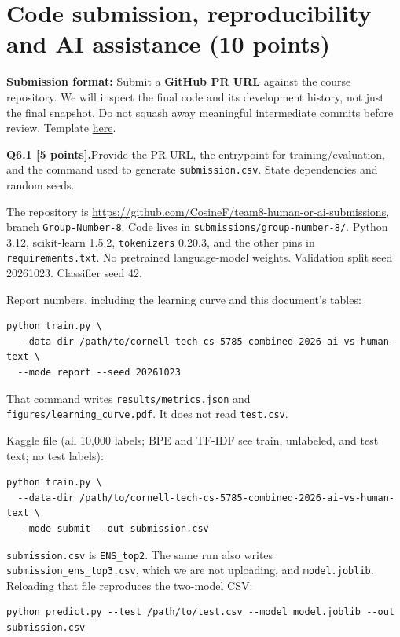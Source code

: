 \documentclass[11pt,letterpaper]{article}
\newcommand{\question}[2]{\needspace{4\baselineskip}\par\addvspace{0.45em}\noindent\textbf{#1}\quad #2\par\nobreak\vspace{0.1em}}
\begin{document}
\section{Code submission, reproducibility and AI assistance (10 points)}
\textbf{Submission format:} Submit a \textbf{GitHub PR URL} against the course repository. We will inspect the final code and its development history, not just the final snapshot. Do not squash away meaningful intermediate commits before review. Template \href{https://github.com/sekhari/human-or-ai-submissions}{here}.

\question{Q6.1 [5 points].}{Provide the PR URL, the entrypoint for training/evaluation, and the command used to generate \texttt{submission.csv}. State dependencies and random seeds.}

The repository is \url{https://github.com/CosineF/team8-human-or-ai-submissions}, branch \texttt{Group-Number-8}. Code lives in \texttt{submissions/group-number-8/}. Python 3.12, scikit-learn 1.5.2, \texttt{tokenizers} 0.20.3, and the other pins in \texttt{requirements.txt}. No pretrained language-model weights. Validation split seed 20261023. Classifier seed 42.

Report numbers, including the learning curve and this document's tables:

\begin{verbatim}
python train.py \
  --data-dir /path/to/cornell-tech-cs-5785-combined-2026-ai-vs-human-text \
  --mode report --seed 20261023
\end{verbatim}

That command writes \texttt{results/metrics.json} and \texttt{figures/learning\_curve.pdf}. It does not read \texttt{test.csv}.

Kaggle file (all 10{,}000 labels; BPE and TF-IDF see train, unlabeled, and test text; no test labels):

\begin{verbatim}
python train.py \
  --data-dir /path/to/cornell-tech-cs-5785-combined-2026-ai-vs-human-text \
  --mode submit --out submission.csv
\end{verbatim}

\texttt{submission.csv} is \texttt{ENS\_top2}. The same run also writes \texttt{submission\_ens\_top3.csv}, which we are not uploading, and \texttt{model.joblib}. Reloading that file reproduces the two-model CSV:

\begin{verbatim}
python predict.py --test /path/to/test.csv --model model.joblib --out submission.csv
\end{verbatim}
\end{document}
